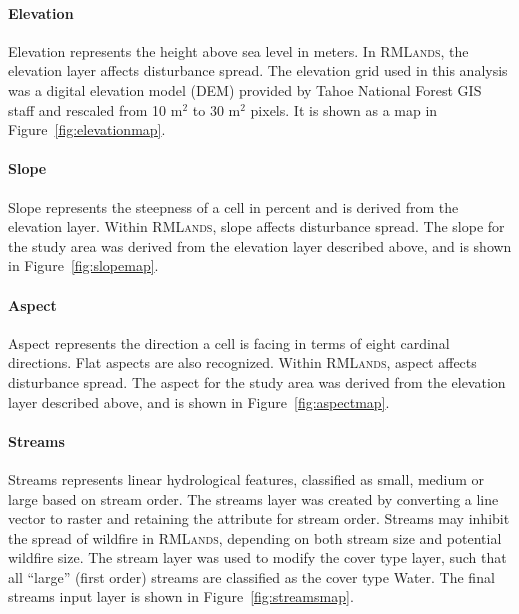 \paragraph*{Elevation} 
Elevation represents the height above sea level in meters. In \textsc{RMLands}, the elevation layer affects disturbance spread. The elevation grid used in this analysis was a digital elevation model (DEM) provided by Tahoe National Forest GIS staff and rescaled from 10 m$^2$ to 30 m$^2$ pixels. It is shown as a map in Figure~\ref{fig:elevationmap}.



\paragraph*{Slope} 
Slope represents the steepness of a cell in percent and is derived from the elevation layer. Within \textsc{RMLands}, slope affects disturbance spread. The slope for the study area was derived from the elevation layer described above, and is shown in Figure~\ref{fig:slopemap}.


\paragraph*{Aspect} Aspect represents the direction a cell is facing in terms of eight cardinal directions. Flat aspects are also recognized. Within \textsc{RMLands}, aspect affects disturbance spread. The aspect for the study area was derived from the elevation layer described above, and is shown in Figure~\ref{fig:aspectmap}. 


\paragraph*{Streams} 
Streams represents linear hydrological features, classified as small, medium or large based on stream order. The streams layer was created by converting a line vector to raster and retaining the attribute for stream order. Streams may inhibit the spread of wildfire in \textsc{RMLands}, depending on both stream size and potential wildfire size. The stream layer was used to modify the cover type layer, such that all ``large'' (first order) streams are classified as the cover type Water. The final streams input layer is shown in Figure~\ref{fig:streamsmap}.


